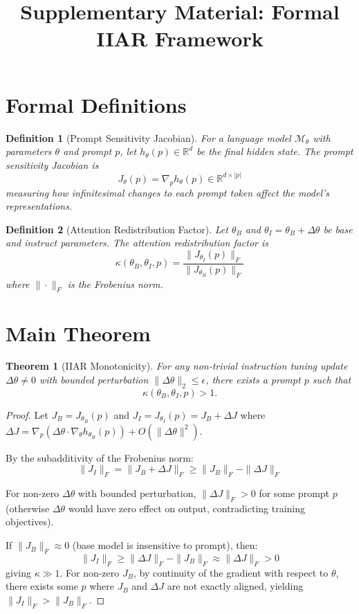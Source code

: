 \documentclass[11pt]{article}
\title{Supplementary Material: Formal IIAR Framework}
\author{}
\newtheorem{theorem}{Theorem}
\newtheorem{definition}{Definition}
\newtheorem{proof}{Proof}
\begin{document}
\maketitle

\section{Formal Definitions}

\begin{definition}[Prompt Sensitivity Jacobian]
For a language model $\mathcal{M}_\theta$ with parameters $\theta$ and prompt $p$, let $h_\theta(p) \in \mathbb{R}^d$ be the final hidden state. The \emph{prompt sensitivity Jacobian} is
\[
J_\theta(p) = \nabla_p h_\theta(p) \in \mathbb{R}^{d \times |p|}
\]
measuring how infinitesimal changes to each prompt token affect the model's representations.
\end{definition}

\begin{definition}[Attention Redistribution Factor]
Let $\theta_B$ and $\theta_I = \theta_B + \Delta\theta$ be base and instruct parameters. The attention redistribution factor is
\[
\kappa(\theta_B, \theta_I, p) = \frac{\|J_{\theta_I}(p)\|_F}{\|J_{\theta_B}(p)\|_F}
\]
where $\|\cdot\|_F$ is the Frobenius norm.
\end{definition}

\section{Main Theorem}

\begin{theorem}[IIAR Monotonicity]
For any non-trivial instruction tuning update $\Delta\theta \neq 0$ with bounded perturbation $\|\Delta\theta\|_2 \leq \epsilon$, there exists a prompt $p$ such that
\[
\kappa(\theta_B, \theta_I, p) > 1.
\]
\end{theorem}

\begin{proof}
Let $J_B = J_{\theta_B}(p)$ and $J_I = J_{\theta_I}(p) = J_B + \Delta J$ where $\Delta J = \nabla_p(\Delta\theta \cdot \nabla_\theta h_{\theta_B}(p)) + O(\|\Delta\theta\|^2)$.

By the subadditivity of the Frobenius norm:
\[
\|J_I\|_F = \|J_B + \Delta J\|_F \geq \|J_B\|_F - \|\Delta J\|_F
\]

For non-zero $\Delta\theta$ with bounded perturbation, $\|\Delta J\|_F > 0$ for some prompt $p$ (otherwise $\Delta\theta$ would have zero effect on output, contradicting training objectives).

If $\|J_B\|_F \approx 0$ (base model is insensitive to prompt), then:
\[
\|J_I\|_F \geq \|\Delta J\|_F - \|J_B\|_F \approx \|\Delta J\|_F > 0
\]
giving $\kappa \gg 1$. For non-zero $J_B$, by continuity of the gradient with respect to $\theta$, there exists some $p$ where $J_B$ and $\Delta J$ are not exactly aligned, yielding $\|J_I\|_F > \|J_B\|_F$.
\end{proof}
\end{document}
